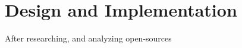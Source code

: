 \chapter{Design and Implementation}



After researching, and analyzing open-sources \cite{convnetjs, gibianskysource} 